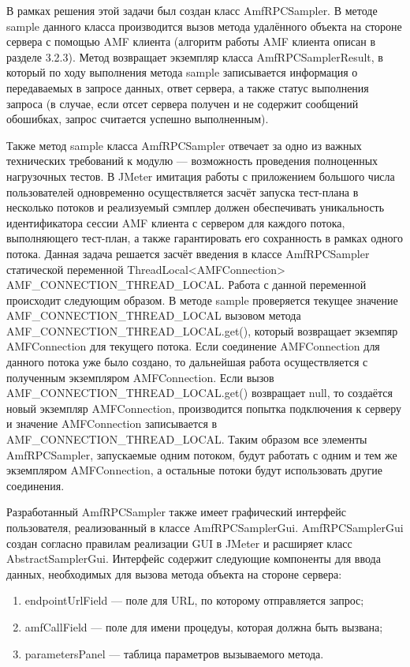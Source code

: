 В рамках решения этой задачи был создан класс AmfRPCSampler. В методе sample данного класса производится вызов метода 
удалённого объекта на стороне сервера с помощью AMF клиента (алгоритм работы AMF клиента описан в разделе 3.2.3). 
Метод возвращает экземпляр класса AmfRPCSamplerResult, в который по ходу выполнения метода sample записывается информация 
о передаваемых в запросе данных, ответ сервера, а также статус выполнения запроса (в случае, если отсет сервера получен и 
не содержит сообщений обошибках, запрос считается успешно выполненным).

Также метод sample класса AmfRPCSampler отвечает за одно из важных технических требований к модулю --- возможность проведения 
полноценных нагрузочных тестов. В JMeter имитация работы с приложением большого числа пользователей одновременно осуществляется 
засчёт запуска тест-плана в несколько потоков и реализуемый сэмплер должен обеспечивать уникальность идентификатора сессии AMF 
клиента с сервером для каждого потока, выполняющего тест-план, а также гарантировать его сохранность в рамках одного потока. 
Данная задача решается засчёт введения в классе AmfRPCSampler статической переменной ThreadLocal<AMFConnection> AMF_CONNECTION_THREAD_LOCAL. 
Работа с данной переменной происходит следующим образом. В методе sample проверяется текущее значение AMF_CONNECTION_THREAD_LOCAL 
вызовом метода AMF_CONNECTION_THREAD_LOCAL.get(), который возвращает экземпяр AMFConnection для текущего потока. 
Если соединение AMFConnection для данного потока уже было создано, то дальнейшая работа осуществляется с полученным экземпляром 
AMFConnection. Если вызов AMF_CONNECTION_THREAD_LOCAL.get() возвращает null, то создаётся новый экземпляр AMFConnection, производится попытка 
подключения к серверу и значение AMFConnection записывается в AMF_CONNECTION_THREAD_LOCAL. Таким образом все элементы AmfRPCSampler, 
запускаемые одним потоком, будут работать с одним и тем же экземпляром AMFConnection, а остальные потоки будут использовать другие 
соединения.

Разработанный AmfRPCSampler также имеет графический интерфейс пользователя, реализованный в классе AmfRPCSamplerGui. AmfRPCSamplerGui 
создан согласно правилам реализации GUI в JMeter и расширяет класс AbstractSamplerGui. Интерфейс содержит следующие компоненты для ввода данных, 
необходимых для вызова метода объекта на стороне сервера:

\begin{enumerate}
\item endpointUrlField --- поле для URL, по которому отправляется запрос;
\item amfCallField --- поле для имени процедуы, которая должна быть вызвана; 
\item parametersPanel --- таблица параметров вызываемого метода.
\end{enumerate}    

